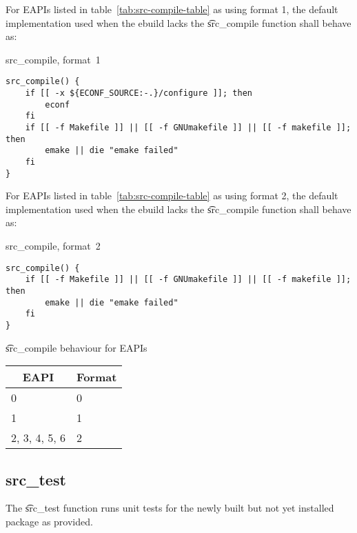  For EAPIs listed in table~\ref{tab:src-compile-table} as using format
1, the default implementation used when the ebuild lacks the \t{src\_compile} function shall behave
as:

\begin{listing}[H]
\caption{src\_compile, format~1} \label{lst:src-compile-1}
\begin{verbatim}
src_compile() {
    if [[ -x ${ECONF_SOURCE:-.}/configure ]]; then
        econf
    fi
    if [[ -f Makefile ]] || [[ -f GNUmakefile ]] || [[ -f makefile ]]; then
        emake || die "emake failed"
    fi
}
\end{verbatim}
\end{listing}

 For EAPIs listed in table~\ref{tab:src-compile-table} as using format
2, the default implementation used when the ebuild lacks the \t{src\_compile} function shall behave
as:

\begin{listing}[H]
\caption{src\_compile, format~2} \label{lst:src-compile-2}
\begin{verbatim}
src_compile() {
    if [[ -f Makefile ]] || [[ -f GNUmakefile ]] || [[ -f makefile ]]; then
        emake || die "emake failed"
    fi
}
\end{verbatim}
\end{listing}

\begin{centertable}{\t{src\_compile} behaviour for EAPIs}
    \label{tab:src-compile-table}
    \begin{tabular}{ll}
      \toprule
      \multicolumn{1}{c}{\textbf{EAPI}} &
      \multicolumn{1}{c}{\textbf{Format}} \\
      \midrule
      0                 & 0 \\
      1                 & 1 \\
      2, 3, 4, 5, 6     & 2 \\
      \bottomrule
    \end{tabular}
\end{centertable}

\subsection{src\_test}
\label{sec:src-test-function}

The \t{src\_test} function runs unit tests for the newly built but not yet installed package as
provided.

